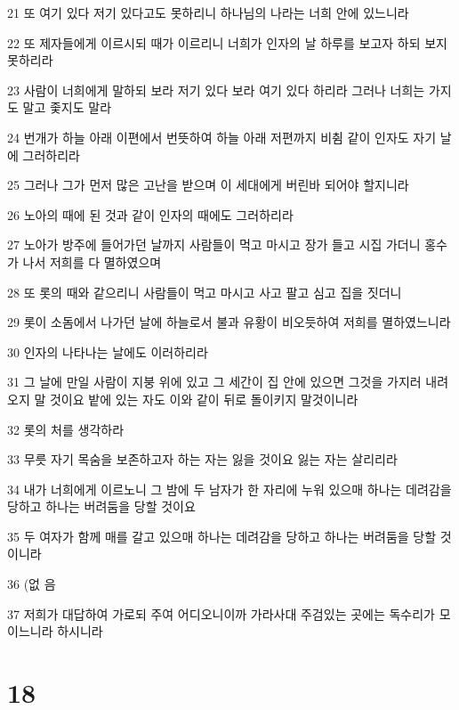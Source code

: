 \par 21 또 여기 있다 저기 있다고도 못하리니 하나님의 나라는 너희 안에 있느니라
\par 22 또 제자들에게 이르시되 때가 이르리니 너희가 인자의 날 하루를 보고자 하되 보지 못하리라
\par 23 사람이 너희에게 말하되 보라 저기 있다 보라 여기 있다 하리라 그러나 너희는 가지도 말고 좇지도 말라
\par 24 번개가 하늘 아래 이편에서 번뜻하여 하늘 아래 저편까지 비췸 같이 인자도 자기 날에 그러하리라
\par 25 그러나 그가 먼저 많은 고난을 받으며 이 세대에게 버린바 되어야 할지니라
\par 26 노아의 때에 된 것과 같이 인자의 때에도 그러하리라
\par 27 노아가 방주에 들어가던 날까지 사람들이 먹고 마시고 장가 들고 시집 가더니 홍수가 나서 저희를 다 멸하였으며
\par 28 또 롯의 때와 같으리니 사람들이 먹고 마시고 사고 팔고 심고 집을 짓더니
\par 29 롯이 소돔에서 나가던 날에 하늘로서 불과 유황이 비오듯하여 저희를 멸하였느니라
\par 30 인자의 나타나는 날에도 이러하리라
\par 31 그 날에 만일 사람이 지붕 위에 있고 그 세간이 집 안에 있으면 그것을 가지러 내려 오지 말 것이요 밭에 있는 자도 이와 같이 뒤로 돌이키지 말것이니라
\par 32 롯의 처를 생각하라
\par 33 무릇 자기 목숨을 보존하고자 하는 자는 잃을 것이요 잃는 자는 살리리라
\par 34 내가 너희에게 이르노니 그 밤에 두 남자가 한 자리에 누워 있으매 하나는 데려감을 당하고 하나는 버려둠을 당할 것이요
\par 35 두 여자가 함께 매를 갈고 있으매 하나는 데려감을 당하고 하나는 버려둠을 당할 것이니라
\par 36 (없 음
\par 37 저희가 대답하여 가로되 주여 어디오니이까 가라사대 주검있는 곳에는 독수리가 모이느니라 하시니라

\chapter{18}

